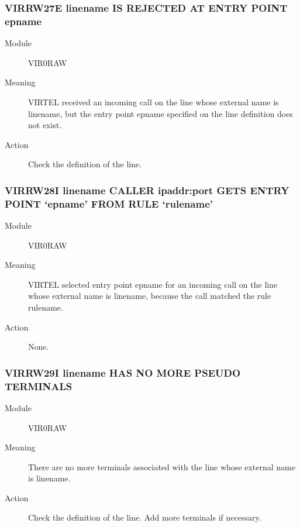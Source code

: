 \documentclass[letterpaper,10pt,english]{sphinxmanual}
\begin{document}
\subsubsection{VIRRW27E linename IS REJECTED AT ENTRY POINT epname}
\label{\detokenize{messages:virrw27e-linename-is-rejected-at-entry-point-epname}}\begin{description}
\item[{Module}] \leavevmode
VIR0RAW

\item[{Meaning}] \leavevmode
VIRTEL received an incoming call on the line whose external name is linename, but the entry point epname specified on the line definition does not exist.

\item[{Action}] \leavevmode
Check the definition of the line.

\end{description}


\subsubsection{VIRRW28I linename CALLER ipaddr:port GETS ENTRY POINT ‘epname’ FROM RULE ‘rulename’}
\label{\detokenize{messages:virrw28i-linename-caller-ipaddr-port-gets-entry-point-epname-from-rule-rulename}}\begin{description}
\item[{Module}] \leavevmode
VIR0RAW

\item[{Meaning}] \leavevmode
VIRTEL selected entry point epname for an incoming call on the line whose external name is linename, because the call matched the rule rulename.

\item[{Action}] \leavevmode
None.

\end{description}


\subsubsection{VIRRW29I linename HAS NO MORE PSEUDO TERMINALS}
\label{\detokenize{messages:virrw29i-linename-has-no-more-pseudo-terminals}}\begin{description}
\item[{Module}] \leavevmode
VIR0RAW

\item[{Meaning}] \leavevmode
There are no more terminals associated with the line whose external name is linename.

\item[{Action}] \leavevmode
Check the definition of the line. Add more terminals if necessary.

\end{description}
\end{document}
